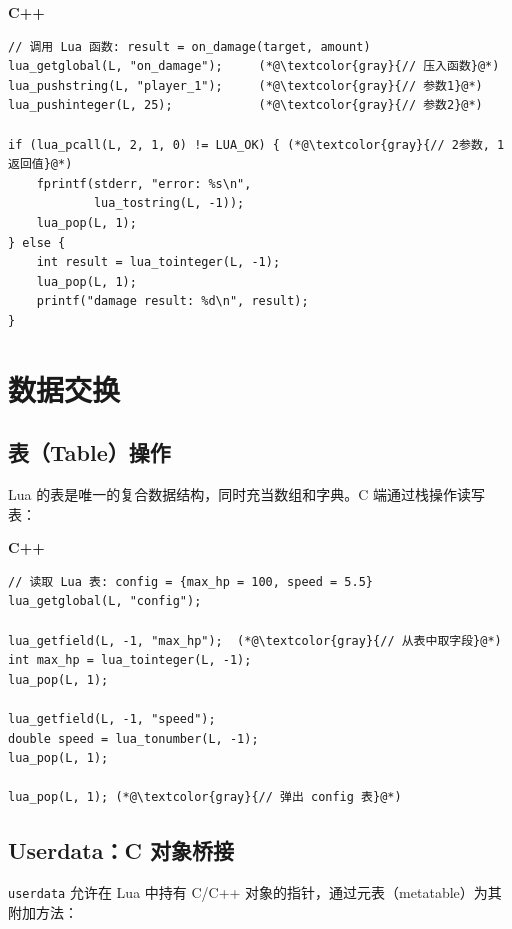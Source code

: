 \documentclass[12pt,a4paper,fontset=fandol]{ctexbook}
\newcommand{\Tp}[1]{\texttt{#1}}
\newcommand{\cpplabel}{%
  \noindent\begin{tcolorbox}[colback=algheadbg,coltext=white,
    sharp corners,boxrule=0pt,width=3.0em,height=1.4em,
    halign=center,valign=center,nobeforeafter,left=0pt,right=0pt,
    top=0pt,bottom=0pt]\small\bfseries C++\end{tcolorbox}}
\begin{document}
\cpplabel
\begin{lstlisting}[style=cppstyle]
// 调用 Lua 函数: result = on_damage(target, amount)
lua_getglobal(L, "on_damage");     (*@\textcolor{gray}{// 压入函数}@*)
lua_pushstring(L, "player_1");     (*@\textcolor{gray}{// 参数1}@*)
lua_pushinteger(L, 25);            (*@\textcolor{gray}{// 参数2}@*)

if (lua_pcall(L, 2, 1, 0) != LUA_OK) { (*@\textcolor{gray}{// 2参数, 1返回值}@*)
    fprintf(stderr, "error: %s\n",
            lua_tostring(L, -1));
    lua_pop(L, 1);
} else {
    int result = lua_tointeger(L, -1);
    lua_pop(L, 1);
    printf("damage result: %d\n", result);
}
\end{lstlisting}

\section{数据交换}\label{sec:lua-data}

\subsection{表（Table）操作}\label{sec:lua-table}

Lua 的表是唯一的复合数据结构，同时充当数组和字典。C 端通过栈操作读写表：

\cpplabel
\begin{lstlisting}[style=cppstyle]
// 读取 Lua 表: config = {max_hp = 100, speed = 5.5}
lua_getglobal(L, "config");

lua_getfield(L, -1, "max_hp");  (*@\textcolor{gray}{// 从表中取字段}@*)
int max_hp = lua_tointeger(L, -1);
lua_pop(L, 1);

lua_getfield(L, -1, "speed");
double speed = lua_tonumber(L, -1);
lua_pop(L, 1);

lua_pop(L, 1); (*@\textcolor{gray}{// 弹出 config 表}@*)
\end{lstlisting}

\subsection{Userdata：C 对象桥接}\label{sec:lua-userdata}

\Tp{userdata} 允许在 Lua 中持有 C/C++ 对象的指针，通过元表（metatable）为其附加方法：
\end{document}
